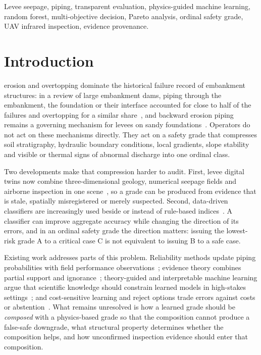 \documentclass[journal]{IEEEtran}
\begin{document}
\begin{IEEEkeywords}
Levee seepage, piping, transparent evaluation, physics-guided machine learning, random forest, multi-objective decision, Pareto analysis, ordinal safety grade, UAV infrared inspection, evidence provenance.
\end{IEEEkeywords}

\section{Introduction}
 erosion and overtopping dominate the historical failure record of embankment structures: in a review of large embankment dams, piping through the embankment, the foundation or their interface accounted for close to half of the failures and overtopping for a similar share~\cite{Foster2000}, and backward erosion piping remains a governing mechanism for levees on sandy foundations~\cite{vanBeek2015}. Operators do not act on these mechanisms directly. They act on a safety grade that compresses soil stratigraphy, hydraulic boundary conditions, local gradients, slope stability and visible or thermal signs of abnormal discharge into one ordinal class.

Two developments make that compression harder to audit. First, levee digital twins now combine three-dimensional geology, numerical seepage fields and airborne inspection in one scene~\cite{Fuller2020,Hou}, so a grade can be produced from evidence that is stale, spatially misregistered or merely suspected. Second, data-driven classifiers are increasingly used beside or instead of rule-based indices~\cite{Xu,Chen}. A classifier can improve aggregate accuracy while changing the direction of its errors, and in an ordinal safety grade the direction matters: issuing the lowest-risk grade A to a critical case C is not equivalent to issuing B to a safe case.

Existing work addresses parts of this problem. Reliability methods update piping probabilities with field performance observations~\cite{Schweckendiek,Roscoe,Baecher2003}; evidence theory combines partial support and ignorance~\cite{Shafer1976,Chen}; theory-guided and interpretable machine learning argue that scientific knowledge should constrain learned models in high-stakes settings~\cite{Karpatne2017,Rudin2019}; and cost-sensitive learning and reject options trade errors against costs or abstention~\cite{Elkan2001,Chow1970,Geifman2017}. What remains unresolved is how a learned grade should be \emph{composed} with a physics-based grade so that the composition cannot produce a false-safe downgrade, what structural property determines whether the composition helps, and how unconfirmed inspection evidence should enter that composition.
\end{document}

